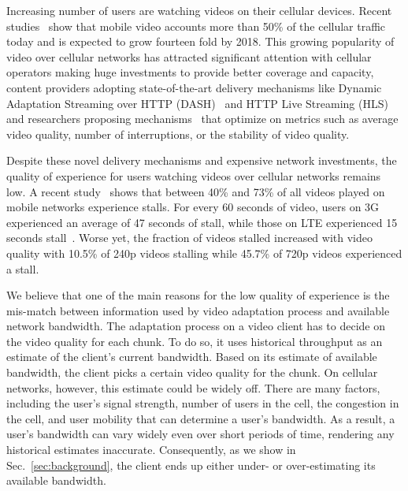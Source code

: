 Increasing number of users are watching videos on their cellular
devices. Recent studies~\cite{cisco-vni} show that mobile video
accounts more than 50\% of the cellular traffic today and is expected
to grow fourteen fold by 2018. This growing popularity of video over
cellular networks has attracted significant attention with cellular
operators making huge investments to provide better coverage and
capacity, content providers adopting state-of-the-art delivery
mechanisms like Dynamic Adaptation Streaming over HTTP
(DASH)~\cite{DASH} and HTTP Live Streaming (HLS)~\cite{HLS} and
researchers proposing mechanisms~\cite{HLS,Festive,BBA} that optimize
on metrics such as average video quality, number of interruptions, or
the stability of video quality.

Despite these novel delivery mechanisms and expensive network
investments, the quality of experience for users watching videos over
cellular networks remains low. A recent study~\cite{opera-stall} shows
that between 40\% and 73\% of all videos played on mobile networks
experience stalls. For every 60 seconds of video, users on 3G
experienced an average of 47 seconds of stall, while those on LTE
experienced 15 seconds stall~\cite{citrix-stall}. Worse yet, the
fraction of videos stalled increased with video quality with 10.5\% of
240p videos stalling while 45.7\% of 720p videos experienced a
stall. 

We believe that one of the main reasons for the low quality of
experience is the mis-match between information used by video
adaptation process and available network bandwidth. The adaptation
process on a video client has to decide on the video quality for each
chunk. To do so, it uses historical throughput as an estimate of the
client's current bandwidth. Based on its estimate of available
bandwidth, the client picks a certain video quality for the chunk. On
cellular networks, however, this estimate could be widely off. There
are many factors, including the user's signal strength, number of
users in the cell, the congestion in the cell, and user mobility that
can determine a user's bandwidth. As a result, a user's bandwidth can
vary widely even over short periods of time, rendering any historical
estimates inaccurate. Consequently, as we show in
Sec.~\ref{sec:background}, the client ends up either under- or
over-estimating its available bandwidth.

